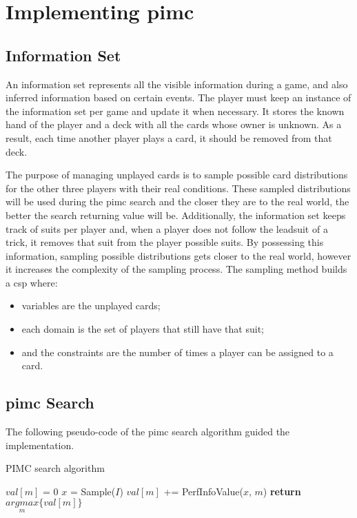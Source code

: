 \section{Implementing \ac{pimc}}
\label{sec:implementing}

\subsection*{Information Set}

An information set represents all the visible information during a game, and also inferred information based on certain events.
The player must keep an instance of the information set per game and update it when necessary.
It stores the known hand of the player and a deck with all the cards whose owner is unknown.
As a result, each time another player plays a card, it should be removed from that deck.

The purpose of managing unplayed cards is to sample possible card distributions for the other three players with their real conditions.
These sampled distributions will be used during the \ac{pimc} search and the closer they are to the real world, the better the search returning value will be.
Additionally, the information set keeps track of suits per player and, when a player does not follow the leadsuit of a trick, it removes that suit from the player possible suits.
By possessing this information, sampling possible distributions gets closer to the real world, however it increases the complexity of the sampling process.
The sampling method builds a \ac{csp} where:
\begin{itemize}
\item variables are the unplayed cards;
\item each domain is the set of players that still have that suit;
\item and the constraints are the number of times a player can be assigned to a card.
\end{itemize}


\subsection*{\ac{pimc} Search}

The following pseudo-code of the \ac{pimc} search algorithm guided the implementation.

\begin{algorithm}
	\caption{PIMC search algorithm}
	\begin{algorithmic}[1]
				\State $val[m]$ = 0
			\EndFor
				\State $x$ = Sample($I$)
					\State $val[m]$ += PerfInfoValue($x$, $m$)
				\EndFor
			\EndFor
			\State \textbf{return} $\underset{m}{argmax}\{ val[m] \}$
		\EndProcedure
	\end{algorithmic}
\end{algorithm}


